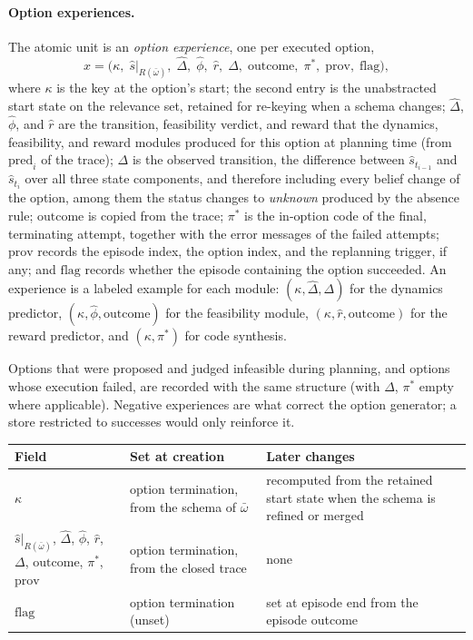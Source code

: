 \documentclass[11pt]{article}
\makeatletter
\newcommand{\Rel}{R}
\newcommand{\shat}{\hat{s}}
\newcommand{\prov}{\mathrm{prov}}
\newenvironment{lifecycle}{\begin{center}\small\begin{tabular}{@{}>{\raggedright\arraybackslash}p{0.17\textwidth}>{\raggedright\arraybackslash}p{0.36\textwidth}>{\raggedright\arraybackslash}p{0.40\textwidth}@{}}\toprule Field & Set at creation & Later changes \\ \midrule}{\bottomrule\end{tabular}\end{center}}
\makeatother
\begin{document}
\paragraph{Option experiences.}
The atomic unit is an \emph{option experience}, one per executed option,
\begin{equation}
x=\big(\kappa,\;\shat|_{\Rel(\bar\omega)},\;\hat\Delta,\;\hat\phi,\;\hat r,\;\Delta,\;\mathrm{outcome},\;\pi^{\ast},\;\prov,\;\mathrm{flag}\big),
\label{eq:experience}
\end{equation}
where $\kappa$ is the key at the option's start; the second entry is the unabstracted start state on the relevance set, retained for re-keying when a schema changes; $\hat\Delta$, $\hat\phi$, and $\hat r$ are the transition, feasibility verdict, and reward that the dynamics, feasibility, and reward modules produced for this option at planning time (from $\mathrm{pred}_i$ of the trace); $\Delta$ is the observed transition, the difference between $\shat_{t_{i-1}}$ and $\shat_{t_i}$ over all three state components, and therefore including every belief change of the option, among them the status changes to \emph{unknown} produced by the absence rule; $\mathrm{outcome}$ is copied from the trace; $\pi^\ast$ is the in-option code of the final, terminating attempt, together with the error messages of the failed attempts; $\prov$ records the episode index, the option index, and the replanning trigger, if any; and $\mathrm{flag}$ records whether the episode containing the option succeeded. An experience is a labeled example for each module: $(\kappa,\hat\Delta,\Delta)$ for the dynamics predictor, $(\kappa,\hat\phi,\mathrm{outcome})$ for the feasibility module, $(\kappa,\hat r,\mathrm{outcome})$ for the reward predictor, and $(\kappa,\pi^\ast)$ for code synthesis.

Options that were proposed and judged infeasible during planning, and options whose execution failed, are recorded with the same structure (with $\Delta$, $\pi^\ast$ empty where applicable). Negative experiences are what correct the option generator; a store restricted to successes would only reinforce it.

\begin{lifecycle}
$\kappa$ & option termination, from the schema of $\bar\omega$ & recomputed from the retained start state when the schema is refined or merged \\
$\shat|_{\Rel(\bar\omega)}$, $\hat\Delta$, $\hat\phi$, $\hat r$, $\Delta$, $\mathrm{outcome}$, $\pi^\ast$, $\prov$ & option termination, from the closed trace & none \\
$\mathrm{flag}$ & option termination (unset) & set at episode end from the episode outcome \\
\end{lifecycle}
\end{document}
